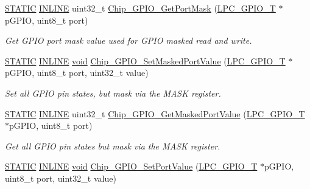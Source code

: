 \begin{DoxyCompactItemize}
\hyperlink{group__LPC__Types__Public__Macros_ga10b2d890d871e1489bb02b7e70d9bdfb}{S\-T\-A\-T\-I\-C} \hyperlink{group__LPC__Types__Public__Types_ga2eb6f9e0395b47b8d5e3eeae4fe0c116}{I\-N\-L\-I\-N\-E} uint32\-\_\-t \hyperlink{group__GPIO__17XX__40XX_ga6b8d692c29a4d64326130bd237826a4b}{Chip\-\_\-\-G\-P\-I\-O\-\_\-\-Get\-Port\-Mask} (\hyperlink{structLPC__GPIO__T}{L\-P\-C\-\_\-\-G\-P\-I\-O\-\_\-\-T} $\ast$p\-G\-P\-I\-O, uint8\-\_\-t port)
\begin{DoxyCompactList}\small\item\em Get G\-P\-I\-O port mask value used for G\-P\-I\-O masked read and write. \end{DoxyCompactList}\item 
\hyperlink{group__LPC__Types__Public__Macros_ga10b2d890d871e1489bb02b7e70d9bdfb}{S\-T\-A\-T\-I\-C} \hyperlink{group__LPC__Types__Public__Types_ga2eb6f9e0395b47b8d5e3eeae4fe0c116}{I\-N\-L\-I\-N\-E} \hyperlink{Paradigm_2Tern__EE_2small_2portmacro_8h_a14d32f8130d3c0b212cfc751730b5b49}{void} \hyperlink{group__GPIO__17XX__40XX_ga45e5422fd37f991f4ff46cdc0090efb4}{Chip\-\_\-\-G\-P\-I\-O\-\_\-\-Set\-Masked\-Port\-Value} (\hyperlink{structLPC__GPIO__T}{L\-P\-C\-\_\-\-G\-P\-I\-O\-\_\-\-T} $\ast$p\-G\-P\-I\-O, uint8\-\_\-t port, uint32\-\_\-t value)
\begin{DoxyCompactList}\small\item\em Set all G\-P\-I\-O pin states, but mask via the M\-A\-S\-K register. \end{DoxyCompactList}\item 
\hyperlink{group__LPC__Types__Public__Macros_ga10b2d890d871e1489bb02b7e70d9bdfb}{S\-T\-A\-T\-I\-C} \hyperlink{group__LPC__Types__Public__Types_ga2eb6f9e0395b47b8d5e3eeae4fe0c116}{I\-N\-L\-I\-N\-E} uint32\-\_\-t \hyperlink{group__GPIO__17XX__40XX_gaa5b183d37e81118b37b30a71279c032b}{Chip\-\_\-\-G\-P\-I\-O\-\_\-\-Get\-Masked\-Port\-Value} (\hyperlink{structLPC__GPIO__T}{L\-P\-C\-\_\-\-G\-P\-I\-O\-\_\-\-T} $\ast$p\-G\-P\-I\-O, uint8\-\_\-t port)
\begin{DoxyCompactList}\small\item\em Get all G\-P\-I\-O pin states but mask via the M\-A\-S\-K register. \end{DoxyCompactList}\item 
\hyperlink{group__LPC__Types__Public__Macros_ga10b2d890d871e1489bb02b7e70d9bdfb}{S\-T\-A\-T\-I\-C} \hyperlink{group__LPC__Types__Public__Types_ga2eb6f9e0395b47b8d5e3eeae4fe0c116}{I\-N\-L\-I\-N\-E} \hyperlink{Paradigm_2Tern__EE_2small_2portmacro_8h_a14d32f8130d3c0b212cfc751730b5b49}{void} \hyperlink{group__GPIO__17XX__40XX_ga095eb3a5396553fa88997b4cfd21e644}{Chip\-\_\-\-G\-P\-I\-O\-\_\-\-Set\-Port\-Value} (\hyperlink{structLPC__GPIO__T}{L\-P\-C\-\_\-\-G\-P\-I\-O\-\_\-\-T} $\ast$p\-G\-P\-I\-O, uint8\-\_\-t port, uint32\-\_\-t value)

\end{DoxyCompactItemize}
